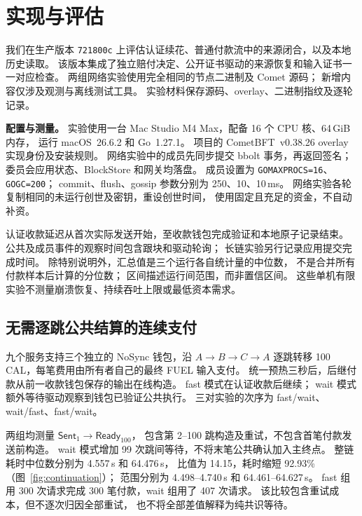 
\section{实现与评估}
\label{sec:evaluation}

我们在生产版本 \texttt{721800c} 上评估认证续花、普通付款流中的来源闭合，以及本地历史读取。
该版本集成了独立赔付决定、公开证书驱动的来源恢复和输入证书一一对应检查。
两组网络实验使用完全相同的节点二进制及 Comet 源码；
新增内容仅涉及观测与离线测试工具。
实验材料保存源码、overlay、二进制指纹及逐轮记录。

\noindent\textbf{配置与测量。}
实验使用一台 Mac Studio M4 Max，配备 16 个 CPU 核、64\,GiB 内存，
运行 macOS~26.6.2 和 Go~1.27.1。
项目的 CometBFT~v0.38.26 overlay 实现身份及安装规则。
网络实验中的成员先同步提交 bbolt 事务，再返回签名；
委员会应用状态、BlockStore 和网关均落盘。
成员设置为 \texttt{GOMAXPROCS=16}、\texttt{GOGC=200}；
commit、flush、gossip 参数分别为 250、10、10\,ms。
网络实验各轮复制相同的未运行创世及密钥，重设创世时间，
使用固定且充足的资金，不自动补资。

认证收款延迟从首次实际发送开始，至收款钱包完成验证和本地原子记录结束。
公共及成员事件的观察时间包含跟块和驱动轮询；
长链实验另行记录应用提交完成时间。
除特别说明外，汇总值是三个运行各自统计量的中位数，
不是合并所有付款样本后计算的分位数；
区间描述运行间范围，而非置信区间。
这些单机有限实验不测量崩溃恢复、持续吞吐上限或最低资本需求。

\subsection{无需逐跳公共结算的连续支付}
\label{sec:eval-continuation}

九个服务支持三个独立的 NoSync 钱包，沿 $A\to B\to C\to A$
逐跳转移 100\,CAL，每笔费用由所有者自己的最终 FUEL 输入支付。
统一预热三秒后，后继付款从前一收款钱包保存的输出在线构造。
fast 模式在认证收款后继续；
wait 模式额外等待驱动观察到钱包已验证公共执行。
三对实验的次序为 fast/wait、wait/fast、fast/wait。

两组均测量 $\mathsf{Sent}_1\to\mathsf{Ready}_{100}$，
包含第 2--100 跳构造及重试，不包含首笔付款发送前构造。
wait 模式增加 99 次跳间等待，不将末笔公共确认加入主终点。
整链耗时中位数分别为 4.557\,s 和 64.476\,s，
比值为 14.15，耗时缩短 92.93\%
（图~\ref{fig:continuation}）；
范围分别为 4.498--4.740\,s 和 64.461--64.627\,s。
fast 组用 300 次请求完成 300 笔付款，wait 组用了 407 次请求。
该比较包含重试成本，但不逐次归因全部重试，
也不将全部差值解释为纯共识等待。

